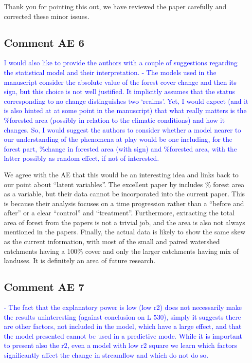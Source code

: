 \documentclass[]{elsarticle} %
\begin{document}
Thank you for pointing this out, we have reviewed the paper carefully and corrected these minor issues.

\hypertarget{comment-ae-6}{%
\subsection{Comment AE 6}\label{comment-ae-6}}

\textcolor{blue}{I would also like to provide the authors with a couple of suggestions regarding the statistical model and their interpretation. 
- The models used in the manuscript consider the absolute value of the forest cover change and then its sign, but this choice is not well justified. It implicitly assumes that the status corresponding to no change distinguishes two ‘realms’. Yet, I would expect (and it is also hinted at at some point in the manuscript) that what really matters is the \%forested area (possibly in relation to the climatic conditions) and how it changes. So, I would suggest the authors to consider whether a model nearer to our understanding of the phenomena at play would be one including, for the forest part, \%change in forested area (with sign) and \%forested area, with the latter possibly as random effect, if not of interested.}

We agree with the AE that this would be an interesting idea and links back to our point about ``latent variables''. The excellent paper by \citet{levy2018} includes \% forest area as a variable, but their data cannot be incorporated into the current paper. This is because their analysis focuses on a time progression rather than a ``before and after'' or a clear ``control'' and ``treatment''.
Furthermore, extracting the total area of forest from the papers is not a trivial job, and the area is also not always mentioned in the papers. Finally, the actual data is likely to show the same skew as the current information, with most of the small and paired watershed catchments having a 100\% cover and only the larger catchments having mix of landuses. It is definitely an area of future research.

\hypertarget{comment-ae-7}{%
\subsection{Comment AE 7}\label{comment-ae-7}}

\textcolor{blue}{- The fact that the explanatory power is low (low r2) does not necessarily make the results uninteresting (against conclusion on L 530), simply it suggests there are other factors, not included in the model, which have a large effect, and that the model presented cannot be used in a predictive mode. While it is important to present also the r2, even a model with low r2 square we learn which factors significantly affect the change in streamflow and which do not do so.}
\end{document}
